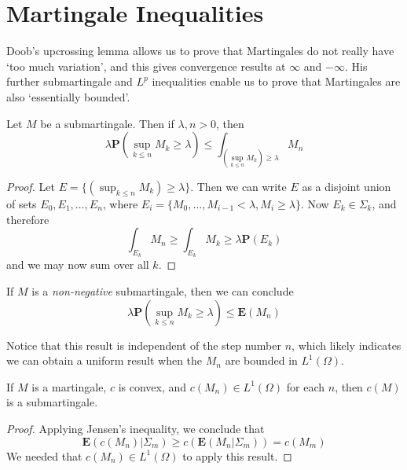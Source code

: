 \section{Martingale Inequalities}

Doob's upcrossing lemma allows us to prove that Martingales do not really have `too much variation', and this gives convergence results at $\infty$ and $-\infty$. His further submartingale and $L^p$ inequalities enable us to prove that Martingales are also `essentially bounded'.

\begin{theorem}
    Let $M$ be a submartingale. Then if $\lambda, n > 0$, then
    \[ \lambda \mathbf{P} \left( \sup_{k \leq n} M_k \geq \lambda \right) \leq \int_{(\sup_{k \leq n} M_k) \geq \lambda} M_n \]
\end{theorem}
\begin{proof}
    Let $E = \{ (\sup_{k \leq n} M_k) \geq \lambda \}$. Then we can write $E$ as a disjoint union of sets $E_0,E_1,\dots, E_n$, where $E_i = \{ M_0, \dots, M_{i-1} < \lambda, M_i \geq \lambda \}$. Now $E_k \in \Sigma_k$, and therefore
    \[ \int_{E_k} M_n \geq \int_{E_k} M_k \geq \lambda \mathbf{P}(E_k) \]
    and we may now sum over all $k$.
\end{proof}

\begin{corollary}
    If $M$ is a {\it non-negative} submartingale, then we can conclude
    \[ \lambda \mathbf{P} \left( \sup_{k \leq n} M_k \geq \lambda \right) \leq \mathbf{E}(M_n) \]
\end{corollary}

Notice that this result is independent of the step number $n$, which likely indicates we can obtain a uniform result when the $M_n$ are bounded in $L^1(\Omega)$.

\begin{lemma}
    If $M$ is a martingale, $c$ is convex, and $c(M_n) \in L^1(\Omega)$ for each $n$, then $c(M)$ is a submartingale.
\end{lemma}
\begin{proof}
    Applying Jensen's inequality, we conclude that
    \[ \mathbf{E}(c(M_n)|\Sigma_m) \geq c(\mathbf{E}(M_n|\Sigma_m)) = c(M_m) \]
    We needed that $c(M_n) \in L^1(\Omega)$ to apply this result.
\end{proof}


